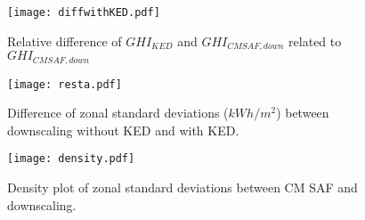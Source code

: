 \documentclass[authoryear, sort&compress]{elsarticle}
\begin{document}
\begin{figure}
  \centering
  \texttt{[image: diffwithKED.pdf]}
  \caption{Relative difference of $GHI_{KED}$ and $GHI_{CMSAF, down}$  related to $GHI_{CMSAF, down}$}
  \label{fig:diffKEDcmsaf}
\end{figure}

\begin{figure}
  \centering
  \texttt{[image: resta.pdf]}
  \caption{Difference of zonal standard deviations ($kWh/m^2$) between downscaling without KED and with KED.}
  \label{fig:zonal}
\end{figure}

\begin{figure}
  \centering
  \texttt{[image: density.pdf]}
  \caption{Density plot of zonal standard deviations between CM SAF and downscaling.}
  \label{fig:density}
\end{figure}
\end{document}
